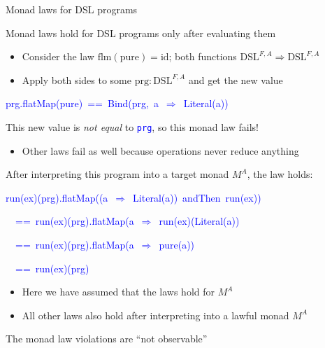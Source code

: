 \documentclass[english,,russian]{beamer}
\newenvironment{lyxcode}
  {\par\begin{list}{}{
    \setlength{\rightmargin}{\leftmargin}
    \setlength{\listparindent}{0pt}%
    \raggedright
    \setlength{\itemsep}{0pt}
    \setlength{\parsep}{0pt}
    \normalfont\ttfamily}%
   \def\{{\char`\{}
   \def\}{\char`\}}
   \def\textasciitilde{\char`\~}
   \item[]}
  {\end{list}}
\begin{document}
\begin{frame}{Monad laws for DSL programs}

Monad laws hold for DSL programs only after evaluating them
\begin{itemize}
\item Consider the law $\text{flm}\left(\text{pure}\right)=\text{id}$;
both functions $\text{DSL}^{F,A}\Rightarrow\text{DSL}^{F,A}$
\item Apply both sides to some $\text{prg}:\text{DSL}^{F,A}$ and get the
new value
\end{itemize}
\begin{lyxcode}
\textcolor{blue}{\footnotesize{}prg.flatMap(pure)~==~Bind(prg,~a~$\Rightarrow$~Literal(a))}{\footnotesize\par}
\end{lyxcode}
\begin{itemize}
\item This new value is \emph{not equal} to \texttt{\textcolor{blue}{\footnotesize{}prg}},
so this monad law fails!
\begin{itemize}
\item Other laws fail as well because operations never reduce anything
\end{itemize}
\item After interpreting this program into a target monad $M^{A}$, the
law holds:
\begin{lyxcode}
\textcolor{blue}{\footnotesize{}run(ex)(prg).flatMap((a~$\Rightarrow$~Literal(a))~andThen~run(ex))~}{\footnotesize\par}

\textcolor{blue}{\footnotesize{}~~==~run(ex)(prg).flatMap(a~$\Rightarrow$~run(ex)(Literal(a))~}{\footnotesize\par}

\textcolor{blue}{\footnotesize{}~~==~run(ex)(prg).flatMap(a~$\Rightarrow$~pure(a))}{\footnotesize\par}

\textcolor{blue}{\footnotesize{}~~==~run(ex)(prg)}{\footnotesize\par}
\end{lyxcode}
\begin{itemize}
\item Here we have assumed that the laws hold for $M^{A}$
\item All other laws also hold after interpreting into a lawful monad $M^{A}$
\end{itemize}
\end{itemize}
The monad law violations are ``not observable''
\end{frame}
\end{document}
